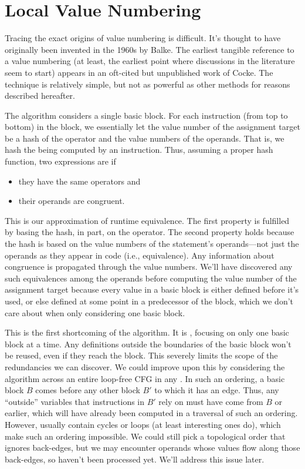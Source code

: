 \section{Local Value Numbering}\label{sec:vn:local}

Tracing the exact origins of value numbering is difficult.  It's thought to
have originally been invented in the 1960s by Balke.  The
earliest tangible reference to a value numbering (at least, the earliest point
where discussions in the literature seem to start) appears in an oft-cited but
unpublished work of Cocke.  The technique is relatively simple,
but not as powerful as other methods for reasons described hereafter.

The algorithm considers a single basic block.  For each instruction (from top
to bottom) in the block, we essentially let the value number of the assignment
target be a hash of the operator and the value numbers of the operands.  That
is, we hash the  being computed by an instruction.  Thus,
assuming a proper hash function, two expressions are  if
%
\begin{itemize}
%
  \item they have the same operators and
%
  \item their operands are congruent.
%
\end{itemize}
%
\noindent This is our approximation of runtime equivalence.  The first property
is fulfilled by basing the hash, in part, on the operator.  The second property
holds because the hash is based on the value numbers of the statement's
operands---not just the operands as they appear in code (i.e., 
equivalence).  Any information about congruence is propagated through the value
numbers.  We'll have discovered any such equivalences among the operands before
computing the value number of the assignment target because every value in a
basic block is either defined before it's used, or else defined at some point
in a predecessor of the block, which we don't care about when only considering
one basic block.

This is the first shortcoming of the algorithm.  It is , focusing
on only one basic block at a time.  Any definitions outside the boundaries of
the basic block won't be reused, even if they reach the block.  This severely
limits the scope of the redundancies we can discover.  We could improve upon
this by considering the algorithm across an entire loop-free \gls{CFG} in any
.  In such an ordering, a basic block $B$ comes before
any other block $B'$ to which it has an edge.  Thus, any ``outside'' variables
that instructions in $B'$ rely on must have come from $B$ or earlier, which
will have already been computed in a traversal of such an ordering.  However,
 usually contain cycles or loops (at least interesting ones do),
which make such an ordering impossible.  We could still pick a topological
order that ignores back-edges, but we may encounter operands whose values flow
along those back-edges, so haven't been processed yet.  We'll address this
issue later.

